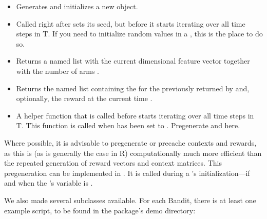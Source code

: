 \documentclass{jss}\usepackage[]{graphicx}\usepackage[]{color}
\begin{document}
\begin{itemize}
  \item{}{ Generates and initializes a new  object. }
  \item{}{
     Called right after  sets its seed,
     but before it starts iterating over all time steps  in T. If you need to initialize random values in a ,
     this is the place to do so.
  }
  \item{}{
     Returns a named list 
     with the current  dimensional  feature vector  together with the number of arms .
 }
  \item{}{
     Returns the named list  containing the 
     for the  previously returned by  and,
     optionally, the  reward
     at the current time .
 }
  \item{}{
     A helper function that is called before  starts iterating over all time steps  in T.
     This function is called when  has been set to .
     Pregenerate  and  here.
  }
\end{itemize}

Where possible, it is advisable to pregenerate or precache  contexts and rewards, as this is (as is generally the case in R) computationally much more efficient than the repeated generation of reward vectors and context matrices. This pregeneration can be implemented in . It is called during a 's initialization---if and when the 's  variable is .

We also made several  subclasses available. For each Bandit, there is at least one example script, to be found in the package’s demo directory:
\end{document}
